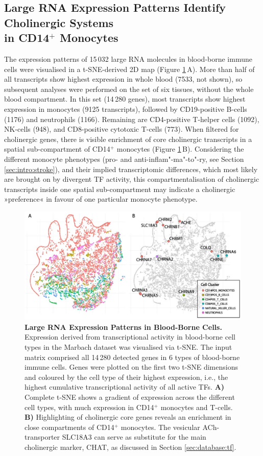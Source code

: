 \subsection{Large RNA Expression Patterns Identify Cholinergic Systems\\ in CD14$^+$ Monocytes}
The expression patterns of 15\,032 large RNA molecules in blood-borne immune cells were visualised in a t-SNE-derived 2D map (Figure \ref{fig:tsne-large}\,A). More than half of all transcripts show highest expression in whole blood (7533, not shown), so subsequent analyses were performed on the set of six tissues, without the whole blood compartment. In this set (14\,280 genes), most transcripts show highest expression in monocytes (9125 transcripts), followed by CD19-positive B-cells (1176) and neutrophils (1166). Remaining are CD4-positive T-helper cells (1092), NK-cells (948), and CD8-positive cytotoxic T-cells (773). When filtered for cholinergic genes, there is visible enrichment of core cholinergic transcripts in a spatial sub-compartment of CD14$^+$ monocytes (Figure \ref{fig:tsne-large}\,B). Considering the different monocyte phenotypes (pro- and anti-inflam"-ma"-to"-ry, see Section \ref{sec:intro:stroke}), and their implied transcriptomic differences, which most likely are brought on by divergent TF activity, this compartmentalisation of cholinergic transcripts inside one spatial sub-compartment may indicate a cholinergic »preference« in favour of one particular monocyte phenotype. 

\begin{figure}[hb]
\includegraphics[width=\textwidth]{figures/tsne-large}
\caption[Large RNA Expression Patterns in Blood-Borne Cells.]{\textbf{Large RNA Expression Patterns in Blood-Borne Cells.} Expression derived from transcriptional activity in blood-borne cell types in the Marbach dataset\cite{Marbach2016} was visualised via t-SNE. The input matrix comprised all 14\,280 detected genes in 6 types of blood-borne immune cells. Genes were plotted on the first two t-SNE dimensions and coloured by the cell type of their highest expression, i.e., the highest cumulative transcriptional activity of all active TFs. \textbf{A)} Complete t-SNE shows a gradient of expression across the different cell types, with much expression in CD14$^+$ monocytes and T-cells. \textbf{B)} Highlighting of cholinergic core genes reveals an enrichment in close compartments of CD14$^+$ monocytes. The vesicular ACh-transporter SLC18A3 can serve as substitute for the main cholinergic marker, CHAT, as discussed in Section \ref{sec:database:tf}.
\label{fig:tsne-large}}
\end{figure}

